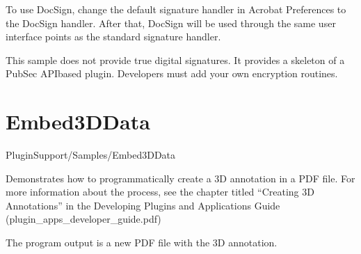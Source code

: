 \documentclass[letterpaper,12pt,english,openany,oneside]{sphinxmanual}
\begin{document}
To use DocSign, change the default signature handler in Acrobat Preferences to the DocSign handler. After that, DocSign will be used through the same user interface points as the standard signature handler.


This sample does not provide true digital signatures. It provides a skeleton of a PubSec API\sphinxhyphen{}based plugin. Developers must add your own encryption routines.


\section{Embed3DData}
\label{\detokenize{Samples_Plug_in:embed3ddata}}\label{\detokenize{Samples_Plug_in:location-6}}

PluginSupport/Samples/Embed3DData

\label{\detokenize{Samples_Plug_in:description-6}}

Demonstrates how to programmatically create a 3D annotation in a PDF file. For more information about the process, see the chapter titled “Creating 3D Annotations” in the Developing Plugins and Applications Guide (plugin\_apps\_developer\_guide.pdf)

The program output is a new PDF file with the 3D annotation.
\end{document}
